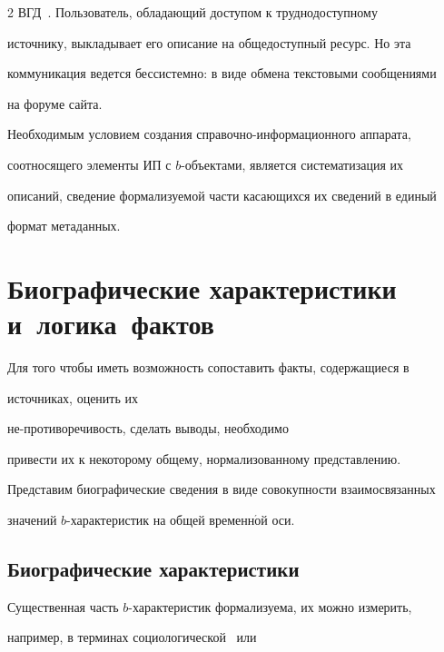 \begin{multicols}{2}
ВГД~\cite{13mar}. Пользователь, обладающий доступом к труднодоступному 


источнику, выкладывает его описание на общедоступный ресурс. Но эта 


коммуникация ведется бессистемно: в виде обмена текстовыми сообщениями 


на форуме сайта.


  


  Необходимым условием создания справочно-ин\-фор\-ма\-ци\-он\-но\-го аппарата, 


соотносящего элементы ИП с $b$-объектами, является систематизация их 


описаний, сведение формализуемой части касающихся их сведений в единый 


формат метаданных. 





\section{Биографические характеристики и~логика~фактов}


     


     Для того чтобы иметь возможность сопоставить факты, содержащиеся в 


источниках, оценить их 


не-\linebreak противоречивость, сделать выводы, необходимо 


привести их к некоторому общему, нормализованному представлению. 


Представим биографические сведения в виде совокупности взаимосвязанных 


значений $b$-характеристик на общей временн$\acute{\mbox{о}}$й оси. 





\subsection{Биографические характеристики}


  


  Существенная часть $b$-характеристик формализуема, их можно измерить, 


например, в терминах социологической~\cite{14mar} или 



\end{multicols}
